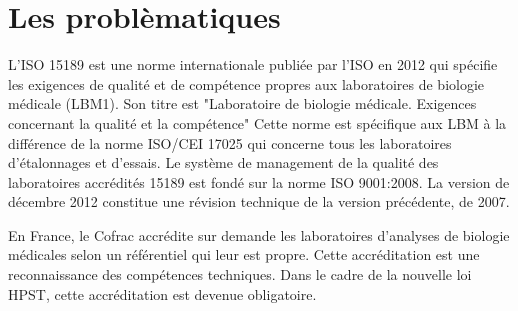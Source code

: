 \section{Les problèmatiques}
L’ISO 15189 est une norme internationale publiée par l’ISO en 2012 qui spécifie les exigences de qualité et de compétence propres aux laboratoires de biologie médicale (LBM1). 
Son titre est "Laboratoire de biologie médicale. Exigences concernant la qualité et la compétence" Cette norme est spécifique aux LBM à la différence de la norme ISO/CEI 17025 qui concerne tous les laboratoires d'étalonnages et d'essais.
Le système de management de la qualité des laboratoires accrédités 15189 est fondé sur la norme ISO 9001:2008. La version de décembre 2012 constitue une révision technique de la version précédente, de 2007.

En France, le Cofrac accrédite sur demande les laboratoires d'analyses de biologie médicales selon un référentiel qui leur est propre. Cette accréditation est une reconnaissance des compétences techniques. Dans le cadre de la nouvelle loi HPST, cette accréditation est devenue obligatoire.

